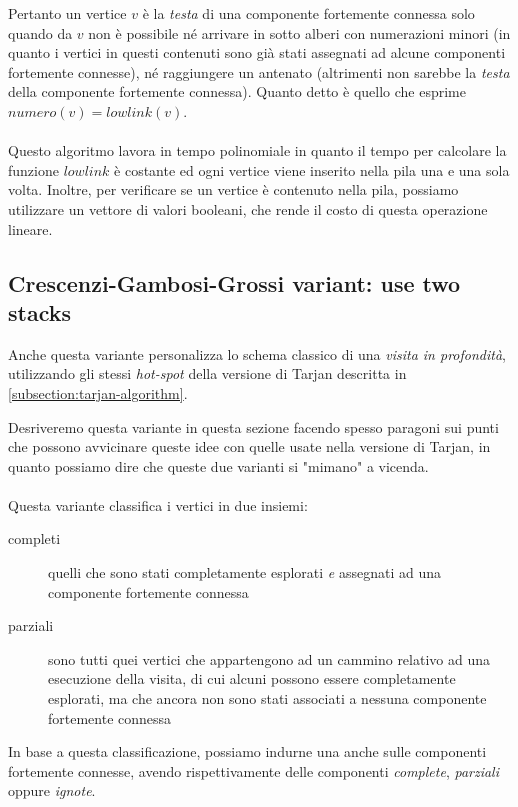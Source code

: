 Pertanto un vertice $v$ \`e la \emph{testa} di una componente
fortemente connessa solo quando da $v$ non \`e possibile n\'e arrivare
in sotto alberi con numerazioni minori (in quanto i vertici in questi
contenuti sono gi\`a stati assegnati ad alcune componenti fortemente
connesse), n\'e raggiungere un antenato (altrimenti non sarebbe la
\emph{testa} della componente fortemente connessa). Quanto detto \`e
quello che esprime $numero(v) = lowlink(v)$.
\\\\
Questo algoritmo lavora in tempo polinomiale in quanto il tempo per
calcolare la funzione $lowlink$ \`e costante ed ogni vertice viene
inserito nella pila una e una sola volta. Inoltre, per verificare se
un vertice \`e contenuto nella pila, possiamo utilizzare un vettore di
valori booleani, che rende il costo di questa operazione lineare.

\subsection{Crescenzi-Gambosi-Grossi variant: use two stacks}
\label{subsection:crescenzi-gambosi-grossi}
Anche questa variante personalizza lo schema classico di una
\emph{visita in profondit\`a}, utilizzando gli stessi \emph{hot-spot}
della versione di Tarjan descritta in
\ref{subsection:tarjan-algorithm}. 

Desriveremo questa variante in questa sezione facendo spesso paragoni
sui punti che possono avvicinare queste idee con quelle usate nella
versione di Tarjan, in quanto possiamo dire che queste due varianti si
"mimano" a vicenda.
\\\\
Questa variante classifica i vertici in due insiemi:
\begin{description}
\item[completi] quelli che sono stati completamente esplorati \emph{e}
  assegnati ad una componente fortemente connessa
\item[parziali] sono tutti quei vertici che appartengono ad un cammino
  relativo ad una esecuzione della visita, di cui alcuni possono
  essere completamente esplorati, ma che ancora non sono stati
  associati a nessuna componente fortemente connessa
\end{description}
In base a questa classificazione, possiamo indurne una anche sulle
componenti fortemente connesse, avendo rispettivamente delle
componenti \emph{complete}, \emph{parziali} oppure \emph{ignote}.

